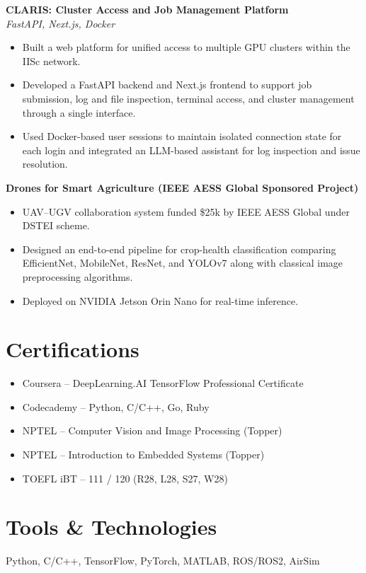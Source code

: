 \documentclass[a4paper,10pt]{article}
\begin{document}
\textbf{CLARIS: Cluster Access and Job Management Platform}\\
\textit{FastAPI, Next.js, Docker}\vspace{-0.4em}
\begin{itemize}
    \item Built a web platform for unified access to multiple GPU clusters within the IISc network.
    \item Developed a FastAPI backend and Next.js frontend to support job submission, log and file inspection, terminal access, and cluster management through a single interface.
    \item Used Docker-based user sessions to maintain isolated connection state for each login and integrated an LLM-based assistant for log inspection and issue resolution.
\end{itemize}

\textbf{Drones for Smart Agriculture (IEEE AESS Global Sponsored Project)}\vspace{-0.4em}
\begin{itemize}
    \item UAV--UGV collaboration system funded \$25k by IEEE AESS Global under DSTEI scheme.
    \item Designed an end-to-end pipeline for crop-health classification comparing EfficientNet, MobileNet, ResNet, and YOLOv7 along with classical image preprocessing algorithms.
    \item Deployed on NVIDIA Jetson Orin Nano for real-time inference.
\end{itemize}

\section*{Certifications}
\begin{itemize}
    \item Coursera – DeepLearning.AI TensorFlow Professional Certificate
    \item Codecademy – Python, C/C++, Go, Ruby
    \item NPTEL – Computer Vision and Image Processing (Topper)
    \item NPTEL – Introduction to Embedded Systems (Topper)
    \item TOEFL iBT – 111 / 120 (R28, L28, S27, W28)
\end{itemize}

\section*{Tools \& Technologies}
Python, C/C++, TensorFlow, PyTorch, MATLAB, ROS/ROS2, AirSim
\end{document}
